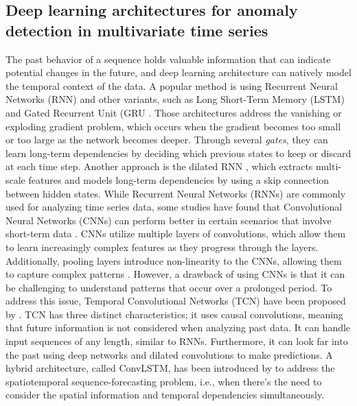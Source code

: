 \subsection{Deep learning architectures for anomaly detection in multivariate time series}
The past behavior of a sequence holds valuable information that can indicate potential changes in the future, and deep learning architecture can natively model the temporal context of the data. A popular method is using Recurrent Neural Networks (RNN) and other variants, such as Long Short-Term Memory (LSTM) \cite{Hochreiter_1997} and Gated Recurrent Unit (GRU \cite{Chung_2014}. Those architectures address the vanishing or exploding gradient problem, which occurs when the gradient becomes too small or too large as the network becomes deeper. Through several \textit{gates}, they can learn long-term dependencies by deciding which previous states to keep or discard at each time step. Another approach is the dilated RNN \cite{Chang_2017}, which extracts multi-scale features and models long-term dependencies by using a skip connection between hidden states. While Recurrent Neural Networks (RNNs) are commonly used for analyzing time series data, some studies have found that Convolutional Neural Networks (CNNs) can perform better in certain scenarios that involve short-term data \cite{choi2021deep}. CNNs utilize multiple layers of convolutions, which allow them to learn increasingly complex features as they progress through the layers. 
Additionally, pooling layers introduce non-linearity to the CNNs, allowing them to capture complex patterns \cite{Albawi_2017}. However, a drawback of using CNNs is that it can be challenging to understand patterns that occur over a prolonged period. To address this issue, Temporal Convolutional Networks (TCN) have been proposed by \cite{Lea_2016}. TCN has three distinct characteristics; it uses causal convolutions, meaning that future information is not considered when analyzing past data. It can handle input sequences of any length, similar to RNNs. Furthermore, it can look far into the past using deep networks and dilated convolutions to make predictions. A hybrid architecture, called ConvLSTM, has been introduced by \cite{Shi_2015} to address the spatiotemporal sequence-forecasting problem, i.e., when there's the need to consider the spatial information and temporal dependencies simultaneously.
